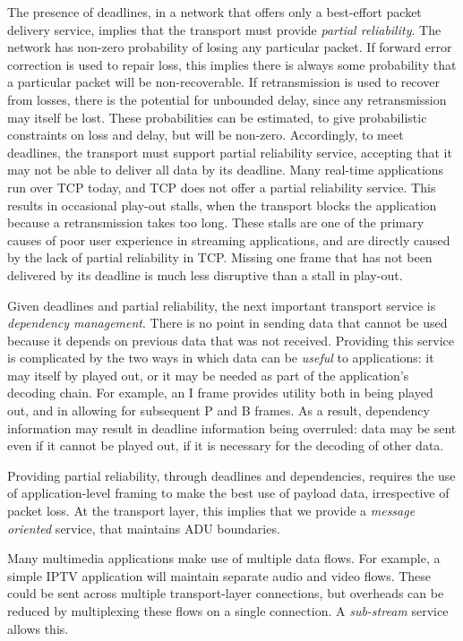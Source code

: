 \documentclass{sig-alternate-05-2015}
\begin{document}
The presence of deadlines, in a network that offers only a best-effort
packet delivery service, implies that the transport must provide
\emph{partial reliability}.
The network has non-zero probability of losing any particular packet. 
If forward error correction is used to repair loss, this implies there is
always some probability that a particular packet will be non-recoverable.
If retransmission is used to recover from losses, there is the potential 
for unbounded delay, since any retransmission may itself be lost. 
These probabilities can be estimated, to give probabilistic constraints
on loss and delay, but will be non-zero. Accordingly, to meet deadlines,
the transport must support partial reliability service, accepting that
it may not be able to deliver all data by its deadline.
Many real-time applications run over TCP today, and TCP does not offer a
partial reliability service. This results in occasional play-out stalls, 
when the transport blocks the application because a retransmission takes
too long. These stalls are one of the primary causes of poor user
experience in streaming applications, and are directly caused by the lack
of partial reliability in TCP. Missing one frame that has not been
delivered by its deadline is much less disruptive than a stall in play-out. 

Given deadlines and partial reliability, the next important transport
service is \emph{dependency management}. There is no point in sending data
that cannot be used because it depends on previous data that was not
received. Providing this service is complicated by the two ways in which
data can be \emph{useful} to applications: it may itself by played out, or
it may be needed as part of the application's decoding chain. For example,
an I frame provides utility both in being played out, and in allowing for
subsequent P and B frames. As a result, dependency information may result
in deadline information being overruled: data may be sent even if it cannot
be played out, if it is necessary for the decoding of other data.

Providing partial reliability, through deadlines and dependencies, requires
the use of application-level framing \cite{clark:1990:architecture} to
make the best use of payload data, irrespective of packet loss. At the
transport layer, this implies that we provide a \emph{message oriented}
service, that maintains ADU boundaries.

Many multimedia applications make use of multiple data flows. For example,
a simple IPTV application will maintain separate audio and video flows.
These could be sent across multiple transport-layer connections, but
overheads can be reduced by multiplexing these flows on a single
connection. A \emph{sub-stream} service allows this.
\end{document}
